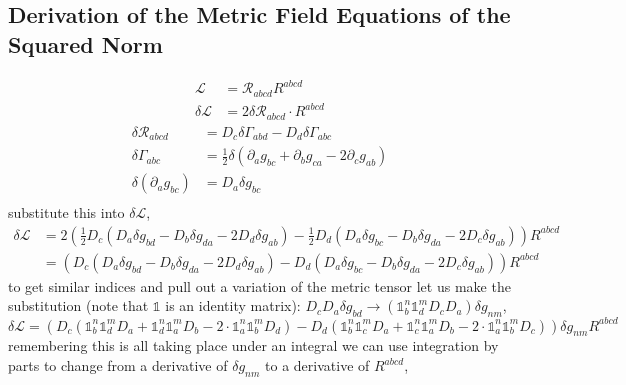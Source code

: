 \documentclass[aps,prd,preprint]{revtex4-1}
\begin{document}
\begin{fleqn}
\section{Derivation of the Metric Field Equations of the Squared Norm}\label{app.derv_metric_field_eqs}
\begin{equation*}
\begin{aligned}
    \mathcal{L} &= \mathcal{R}_{abcd} R^{abcd} \\
    \delta \mathcal{L} &= 2 \delta \mathcal{R}_{abcd} \cdot R^{abcd}
\end{aligned}
\end{equation*}
\begin{equation*}
\begin{aligned}
    \delta \mathcal{R}_{abcd} &= D_c \delta \Gamma_{abd} - D_d \delta \Gamma_{abc} \\
    \delta \Gamma_{abc} &= \frac{1}{2} \delta(\partial_a g_{bc} + \partial_b g_{ca} - 2 \partial_c g_{ab}) \\
    \delta (\partial_a g_{bc}) &= D_a \delta g_{bc} \\
\end{aligned}
\end{equation*}
substitute this into $\delta \mathcal{L}$,
\begin{align*}
    \delta \mathcal{L} &= 2\left( \frac{1}{2} D_c (D_a \delta g_{bd} - D_b \delta g_{da} - 2 D_d \delta g_{ab}) - \frac{1}{2} D_d (D_a \delta g_{bc} - D_b \delta g_{da} - 2 D_c \delta g_{ab}) \right) R^{abcd} \\
    &= \left( D_c (D_a \delta g_{bd} - D_b \delta g_{da} - 2 D_d \delta g_{ab}) - D_d (D_a \delta g_{bc} - D_b \delta g_{da} - 2 D_c \delta g_{ab}) \right) R^{abcd}
\end{align*}
to get similar indices and pull out a variation of the metric tensor let us make the substitution (note that $\mathds{1}$ is an identity matrix): $D_c D_a \delta g_{bd} \rightarrow (\mathds{1}^n_b \mathds{1}^m_d D_c D_a) \delta g_{nm}$,
\begin{equation*}
    \delta \mathcal{L} = \left( D_c (\mathds{1}^n_b \mathds{1}^m_d D_a + \mathds{1}^n_d \mathds{1}^m_a D_b - 2 \cdot \mathds{1}^n_a \mathds{1}^m_b D_d) - D_d (\mathds{1}^n_b \mathds{1}^m_c D_a + \mathds{1}^n_c \mathds{1}^m_a D_b - 2 \cdot \mathds{1}^n_a \mathds{1}^m_b D_c) \right) \delta g_{nm} R^{abcd}
\end{equation*}
remembering this is all taking place under an integral we can use integration by parts to change from a derivative of $\delta g_{nm}$ to a derivative of $R^{abcd}$,

\end{fleqn}
\end{document}
